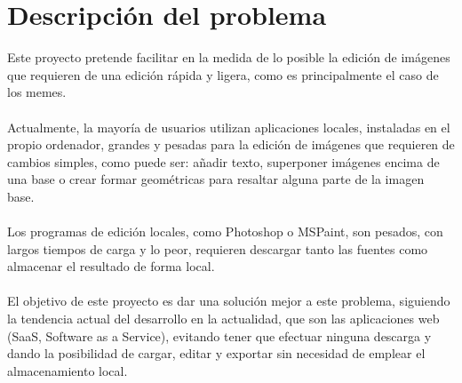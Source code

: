 \chapter{Descripción del problema}

Este proyecto pretende facilitar en la medida de lo posible la edición de imágenes que requieren
de una edición rápida y ligera, como es principalmente el caso de los memes.
\\\\
Actualmente, la mayoría de usuarios utilizan aplicaciones locales, instaladas en el propio
ordenador, grandes y pesadas para la edición de imágenes que requieren de cambios simples, 
como puede ser: añadir texto, superponer imágenes encima de una base o crear formar geométricas
para resaltar alguna parte de la imagen base.
\\\\
Los programas de edición locales, como Photoshop o MSPaint, son pesados, con largos tiempos de
carga y lo peor, requieren descargar tanto las fuentes como almacenar el resultado de forma local.
\\\\
El objetivo de este proyecto es dar una solución mejor a este problema, siguiendo la tendencia
actual del desarrollo en la actualidad, que son las aplicaciones web (SaaS, Software as a Service), 
evitando tener que efectuar ninguna descarga y dando la posibilidad de cargar, editar y exportar sin 
necesidad de emplear el almacenamiento local.


